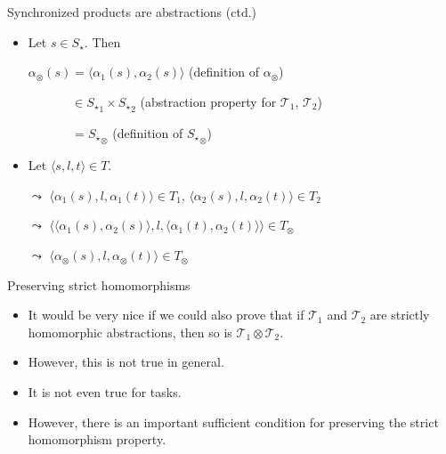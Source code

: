 \documentclass{gkibeamer}
\begin{document}
\begin{frame}{Synchronized products are abstractions (ctd.)}
  \begin{proofend}
    \begin{itemize}
    \item {}
      
      Let $s \in S_\star$. Then

      $\alpha_{\otimes}(s) = \langle \alpha_1(s), \alpha_2(s)\rangle$
      \quad (definition of $\alpha_{\otimes}$)

      $\phantom{\alpha_{\otimes}(s)} \in {S_\star}_1 \times {S_\star}_2$
      \quad (abstraction property for $\mathcal T_1$, $\mathcal T_2$)

      $\phantom{\alpha_{\otimes}(s)} = {S_\star}_{\otimes}$
      \quad (definition of ${S_\star}_{\otimes}$)
      \pause

    \item {}

      Let $\langle s, l, t\rangle \in T$.

      $\leadsto$ $\langle \alpha_1(s), l, \alpha_1(t)\rangle \in T_1$,
      $\langle \alpha_2(s), l, \alpha_2(t)\rangle \in T_2$

      $\leadsto$ $\langle \langle \alpha_1(s), \alpha_2(s)\rangle, l,
      \langle \alpha_1(t), \alpha_2(t)\rangle\rangle \in T_{\otimes}$

      $\leadsto$ $\langle \alpha_{\otimes}(s), l,
      \alpha_{\otimes}(t)\rangle \in T_{\otimes}$
    \end{itemize}
  \end{proofend}
\end{frame}

\begin{frame}{Preserving strict homomorphisms}
  \begin{itemize}
  \item It would be very nice if we could also prove that if $\mathcal
    T_1$ and $\mathcal T_2$ are \alert{strictly homomorphic} abstractions,
    then so is $\mathcal T_1 \otimes \mathcal T_2$.
  \item However, this is \alert{not true} in general.
  \item It is \alert{not even} true for {\sasplus} tasks.
  \item However, there is an important \alert{sufficient condition}
    for preserving the strict homomorphism property.
  \end{itemize}
\end{frame}
\end{document}

